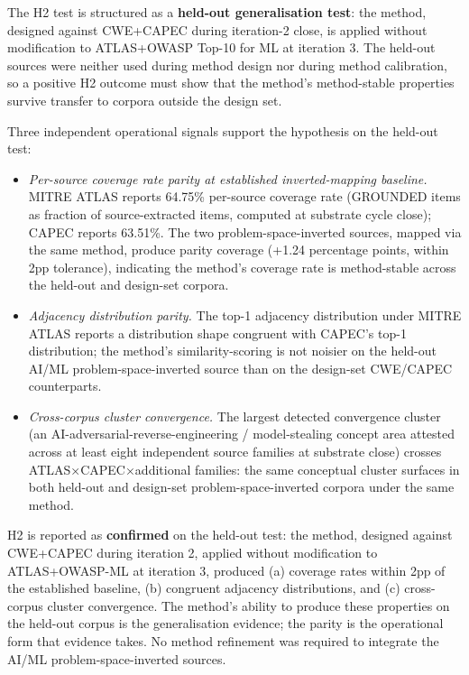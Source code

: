 \documentclass[
]{article}
\providecommand{\tightlist}{%
  \setlength{\itemsep}{0pt}\setlength{\parskip}{0pt}}
\begin{document}
The H2 test is structured as a \textbf{held-out generalisation test}:
the method, designed against CWE+CAPEC during iteration-2 close, is
applied without modification to ATLAS+OWASP Top-10 for ML at iteration
3. The held-out sources were neither used during method design nor
during method calibration, so a positive H2 outcome must show that the
method's method-stable properties survive transfer to corpora outside
the design set.

Three independent operational signals support the hypothesis on the
held-out test:

\begin{itemize}
\tightlist
\item
  \emph{Per-source coverage rate parity at established inverted-mapping
  baseline.} MITRE ATLAS reports 64.75\% per-source coverage rate
  (GROUNDED items as fraction of source-extracted items, computed at
  substrate cycle close); CAPEC reports 63.51\%. The two
  problem-space-inverted sources, mapped via the same method, produce
  parity coverage (+1.24 percentage points, within 2pp tolerance),
  indicating the method's coverage rate is method-stable across the
  held-out and design-set corpora.
\item
  \emph{Adjacency distribution parity.} The top-1 adjacency distribution
  under MITRE ATLAS reports a distribution shape congruent with CAPEC's
  top-1 distribution; the method's similarity-scoring is not noisier on
  the held-out AI/ML problem-space-inverted source than on the
  design-set CWE/CAPEC counterparts.
\item
  \emph{Cross-corpus cluster convergence.} The largest detected
  convergence cluster (an AI-adversarial-reverse-engineering /
  model-stealing concept area attested across at least eight independent
  source families at substrate close) crosses ATLAS×CAPEC×additional
  families: the same conceptual cluster surfaces in both held-out and
  design-set problem-space-inverted corpora under the same method.
\end{itemize}

H2 is reported as \textbf{confirmed} on the held-out test: the method,
designed against CWE+CAPEC during iteration 2, applied without
modification to ATLAS+OWASP-ML at iteration 3, produced (a) coverage
rates within 2pp of the established baseline, (b) congruent adjacency
distributions, and (c) cross-corpus cluster convergence. The method's
ability to produce these properties on the held-out corpus is the
generalisation evidence; the parity is the operational form that
evidence takes. No method refinement was required to integrate the AI/ML
problem-space-inverted sources.
\end{document}
